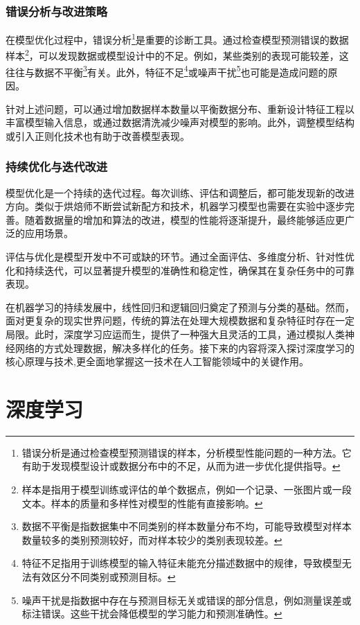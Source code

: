 \subsubsection{错误分析与改进策略}

在模型优化过程中，错误分析\footnote{错误分析是通过检查模型预测错误的样本，分析模型性能问题的一种方法。它有助于发现模型设计或数据分布中的不足，从而为进一步优化提供指导。}是重要的诊断工具。通过检查模型预测错误的数据样本\footnote{样本是指用于模型训练或评估的单个数据点，例如一个记录、一张图片或一段文本。样本的质量和多样性对模型的性能有直接影响。}，可以发现数据或模型设计中的不足。例如，某些类别的表现可能较差，这往往与数据不平衡\footnote{数据不平衡是指数据集中不同类别的样本数量分布不均，可能导致模型对样本数量较多的类别预测较好，而对样本较少的类别表现较差。}有关。此外，特征不足\footnote{特征不足指用于训练模型的输入特征未能充分描述数据中的规律，导致模型无法有效区分不同类别或预测目标。}或噪声干扰\footnote{噪声干扰是指数据中存在与预测目标无关或错误的部分信息，例如测量误差或标注错误。这些干扰会降低模型的学习能力和预测准确性。}也可能是造成问题的原因。

针对上述问题，可以通过增加数据样本数量以平衡数据分布、重新设计特征工程以丰富模型输入信息，或通过数据清洗减少噪声对模型的影响。此外，调整模型结构或引入正则化技术也有助于改善模型表现。

\subsubsection{持续优化与迭代改进}

模型优化是一个持续的迭代过程。每次训练、评估和调整后，都可能发现新的改进方向。类似于烘焙师不断尝试新配方和技术，机器学习模型也需要在实验中逐步完善。随着数据量的增加和算法的改进，模型的性能将逐渐提升，最终能够适应更广泛的应用场景。

评估与优化是模型开发中不可或缺的环节。通过全面评估、多维度分析、针对性优化和持续迭代，可以显著提升模型的准确性和稳定性，确保其在复杂任务中的可靠表现。

在机器学习的持续发展中，线性回归和逻辑回归奠定了预测与分类的基础。然而，面对更复杂的现实世界问题，传统的算法在处理大规模数据和复杂特征时存在一定局限。此时，深度学习应运而生，提供了一种强大且灵活的工具，通过模拟人类神经网络的方式处理数据，解决多样化的任务。接下来的内容将深入探讨深度学习的核心原理与技术,更全面地掌握这一技术在人工智能领域中的关键作用。

\section{深度学习}

